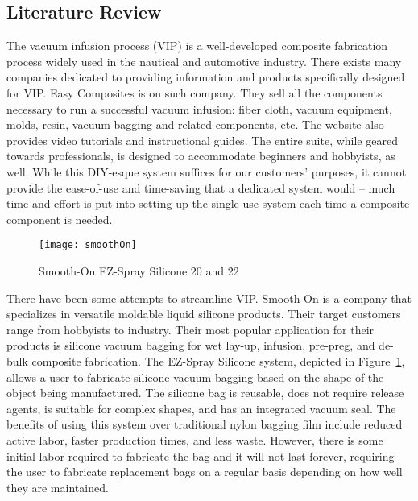 \documentclass[12pt,letterpaper,notitlepage]{article}
\begin{document}
\subsection{Literature Review}
The vacuum infusion process (VIP) is a well-developed composite fabrication process widely used in the nautical and automotive industry. There exists many companies dedicated to providing information and products specifically designed for VIP. Easy Composites is on such company. They sell all the components necessary to run a successful vacuum infusion: fiber cloth, vacuum equipment, molds, resin, vacuum bagging and related components, etc. The website also provides video tutorials and instructional guides. The entire suite, while geared towards professionals, is designed to accommodate beginners and hobbyists, as well. While this DIY-esque system suffices for our customers’ purposes, it cannot provide the ease-of-use and time-saving that a dedicated system would – much time and effort is put into setting up the single-use system each time a composite component is needed.\\

\begin{figure}
\centering
\texttt{[image: smoothOn]}
\label{fig:smoothOn}
\caption{Smooth-On EZ-Spray Silicone 20 and 22}
\end{figure}
There have been some attempts to streamline VIP.  Smooth-On is a company that specializes in versatile moldable liquid silicone products. Their target customers range from hobbyists to industry. Their most popular application for their products is silicone vacuum bagging for wet lay-up, infusion, pre-preg, and de-bulk composite fabrication. The EZ-Spray Silicone system, depicted in Figure~\ref{fig:smoothOn}, allows a user to fabricate silicone vacuum bagging based on the shape of the object being manufactured. The silicone bag is reusable, does not require release agents, is suitable for complex shapes, and has an integrated vacuum seal. The benefits of using this system over traditional nylon bagging film include reduced active labor, faster production times, and less waste. However, there is some initial labor required to fabricate the bag and it will not last forever, requiring the user to fabricate replacement bags on a regular basis depending on how well they are maintained.\\
\end{document}
